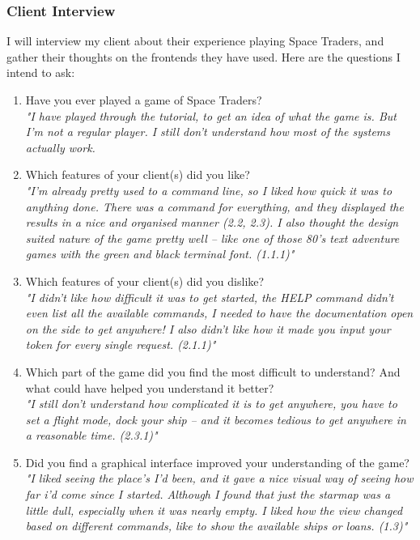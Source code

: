 \subsubsection{Client Interview}
I will interview my client about their experience playing Space Traders, and gather their thoughts on the frontends they have used. Here are the questions I intend to ask:
\begin{enumerate}
    \item Have you ever played a game of Space Traders? \\
        \textit{"I have played through the tutorial, to get an idea of what the game is. But I'm not a regular player. I still don't understand how most of the systems actually work.}
    \item Which features of your client(s) did you like? \\ 
        \textit{"I'm already pretty used to a command line, so I liked how quick it was to anything done. There was a command for everything, and they displayed the results in a nice and organised manner (2.2, 2.3). I also thought the design suited nature of the game pretty well – like one of those 80's text adventure games with the green and black terminal font. (1.1.1)"}
    \item Which features of your client(s) did you dislike? \\ 
        \textit{"I didn't like how difficult it was to get started, the HELP command didn't even list all the available commands, I needed to have the documentation open on the side to get anywhere! I also didn't like how it made you input your token for every single request. (2.1.1)"}
    \item Which part of the game did you find the most difficult to understand? And what could have helped you understand it better?\\
        \textit{"I still don't understand how complicated it is to get anywhere, you have to set a flight mode, dock your ship – and it becomes tedious to get anywhere in a reasonable time. (2.3.1)" }
    \item Did you find a graphical interface improved your understanding of the game?\\
        \textit{"I liked seeing the place's I'd been, and it gave a nice visual way of seeing how far i'd come since I started. Although I found that just the starmap was a little dull, especially when it was nearly empty. I liked how the view changed based on different commands, like to show the available ships or loans. (1.3)"}

\end{enumerate}
